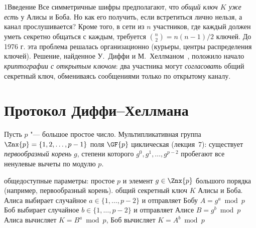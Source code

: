 \begin{lecture}{1}{Введение}
Все симметричные шифры предполагают, что \emph{общий ключ $K$ уже есть} у Алисы и Боба. Но как
его получить, если встретиться лично нельзя, а канал прослушивается? Кроме того, в сети из $n$
участников, где каждый должен уметь секретно общаться с каждым, требуется $\binom n2 =
n(n - 1)/2$ ключей. До 1976 г. эта проблема решалась организационно (курьеры, центры
распределения ключей). Решение, найденное У.~Диффи и М.~Хеллманом~\cite{diffie-hellman},
положило начало \emph{криптографии с открытым ключом}: два участника могут \emph{согласовать}
общий секретный ключ, обмениваясь сообщениями только по открытому каналу.


\section{Протокол Диффи--Хеллмана}\label{l1:dh}

Пусть $p$ "--- большое простое число. Мультипликативная группа $\Znx{p} = \{1, 2, \dots,
p - 1\}$ поля $\GF{p}$ циклическая (лекция~7): существует \emph{первообразный корень} $g$,
степени которого $g^0, g^1, \dots, g^{p-2}$ пробегают все ненулевые вычеты по модулю $p$.

\begin{algorithm}\label{l1:dh-alg}
\begin{algorithmic}[1]
\Require общедоступные параметры: простое $p$ и элемент $g \in \Znx{p}$ большого порядка
  (например, первообразный корень).
\Ensure общий секретный ключ $K$ Алисы и Боба.
\State Алиса выбирает случайное $a \in \{1, \dots, p - 2\}$ и отправляет Бобу
  $A = g^a \bmod p$
\State Боб выбирает случайное $b \in \{1, \dots, p - 2\}$ и отправляет Алисе
  $B = g^b \bmod p$
\State Алиса вычисляет $K = B^a \bmod p$, Боб вычисляет $K = A^b \bmod p$
\end{algorithmic}
\end{algorithm}


\end{lecture}
